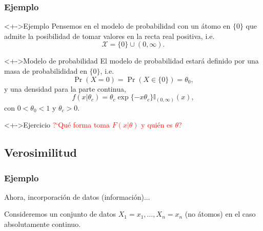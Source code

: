 \documentclass[cjk,t,compress]{beamer}
\renewcommand{\exp}{\operatorname{\text{exp}}}
\begin{document}
	\frame
	{
    \frametitle{Ejemplo}
  		{\scriptsize  	
		
		\begin{block}<+->{Ejemplo}
	  	{
		Pensemos en el modelo de probabilidad con un \'atomo en $\{0\}$ que admite la posibilidad de tomar valores en la recta real positiva, i.e.
		$$
		\mathcal{X}=\{0\}\cup(0,\infty).
		$$
		}
 		\end{block}  		

		\begin{block}<+->{Modelo de probabilidad}
	  	{
		El modelo de probabilidad estar\'a definido por una masa de probabilididad en $\{0\}$, i.e.
		$$
		\Pr(X=0)=\Pr(X\in\{0\})=\theta_0,
		$$
		y una densidad para la parte continua,
		$$
		f(x|\theta_c)=\theta_c\exp\{-x\theta_c\}\mathbb{I}_{(0,\infty)}(x),
		$$
		con $0<\theta_0<1$ y $\theta_c>0$.
		}
 		\end{block}  		

		\begin{block}<+->{Ejercicio}
	  	{
	  	\textcolor{red}{?`Qu\'e forma toma $F(x|\theta)$ y qui\'en es $\theta$?}
		}
 		\end{block}  		

		}
	}


	\subsection{Verosimilitud}
	\frame
	{
    \frametitle{Ejemplo}
  		{\scriptsize  	
		
Ahora, incorporaci\'on de datos (informaci\'on)...		

\vfill

	  	Consideremos un conjunto de datos $X_1=x_1,\ldots,X_n=x_n$ (no \'atomos) en el caso absolutamente continuo.
	  	

		}
	}
	
\end{document}

